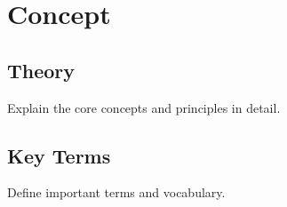 \section{Concept}
\subsection*{Theory}
Explain the core concepts and principles in detail.
\subsection*{Key Terms}
Define important terms and vocabulary.